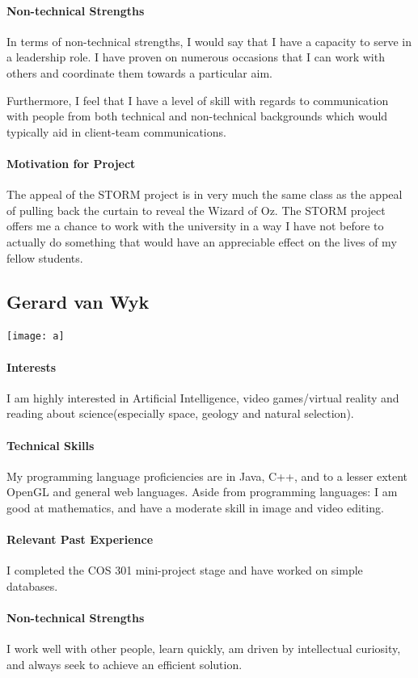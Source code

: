 \documentclass[12pt]{article}
\begin{document}
\paragraph{Non-technical Strengths}
In terms of non-technical strengths, I would say that I have a capacity to serve in a leadership role. I have proven on numerous occasions that I can work with others and coordinate them towards a particular aim.

Furthermore, I feel that I have a level of skill with regards to communication with people from both technical and non-technical backgrounds which would typically aid in client-team communications.
\paragraph{Motivation for Project}
The appeal of the STORM project is in very much the same class as the appeal of pulling back the curtain to reveal the Wizard of Oz. The STORM project offers me a chance to work with the university in a way I have not before to actually do something that would have an appreciable effect on the lives of my fellow students.

\subsection{Gerard van Wyk}
\texttt{[image: a]}
\paragraph{Interests}
I am highly interested in Artificial Intelligence, video games/virtual reality and reading about science(especially space, geology and natural selection).
\paragraph{Technical Skills}
My programming language proficiencies are in Java, C++, and to a lesser extent OpenGL and general web languages.
Aside from programming languages: I am good at mathematics, and have a moderate skill in image and video editing.
\paragraph{Relevant Past Experience}
I completed the COS 301 mini-project stage and have worked on simple databases.
\paragraph{Non-technical Strengths}
I work well with other people, learn quickly, am driven by intellectual curiosity, and always seek to achieve an efficient solution.
\end{document}
